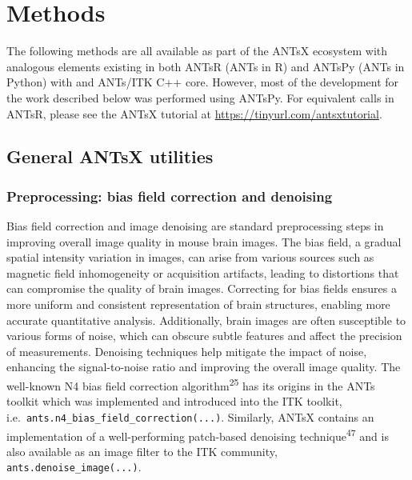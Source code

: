\documentclass[
  12pt,
]{article}
\begin{document}
\clearpage
\newpage

\hypertarget{methods}{%
\section{Methods}\label{methods}}

The following methods are all available as part of the ANTsX ecosystem
with analogous elements existing in both ANTsR (ANTs in R) and ANTsPy
(ANTs in Python) with and ANTs/ITK C++ core. However, most of the
development for the work described below was performed using ANTsPy. For
equivalent calls in ANTsR, please see the ANTsX tutorial at
\url{https://tinyurl.com/antsxtutorial}.

\hypertarget{general-antsx-utilities}{%
\subsection{General ANTsX utilities}\label{general-antsx-utilities}}

\hypertarget{preprocessing-bias-field-correction-and-denoising}{%
\subsubsection{Preprocessing: bias field correction and
denoising}\label{preprocessing-bias-field-correction-and-denoising}}

Bias field correction and image denoising are standard preprocessing
steps in improving overall image quality in mouse brain images. The bias
field, a gradual spatial intensity variation in images, can arise from
various sources such as magnetic field inhomogeneity or acquisition
artifacts, leading to distortions that can compromise the quality of
brain images. Correcting for bias fields ensures a more uniform and
consistent representation of brain structures, enabling more accurate
quantitative analysis. Additionally, brain images are often susceptible
to various forms of noise, which can obscure subtle features and affect
the precision of measurements. Denoising techniques help mitigate the
impact of noise, enhancing the signal-to-noise ratio and improving the
overall image quality. The well-known N4 bias field correction
algorithm\textsuperscript{25} has its origins in the ANTs toolkit which
was implemented and introduced into the ITK toolkit,
i.e.~\texttt{ants.n4\_bias\_field\_correction(...)}. Similarly, ANTsX
contains an implementation of a well-performing patch-based denoising
technique\textsuperscript{47} and is also available as an image filter
to the ITK community, \texttt{ants.denoise\_image(...)}.
\end{document}
